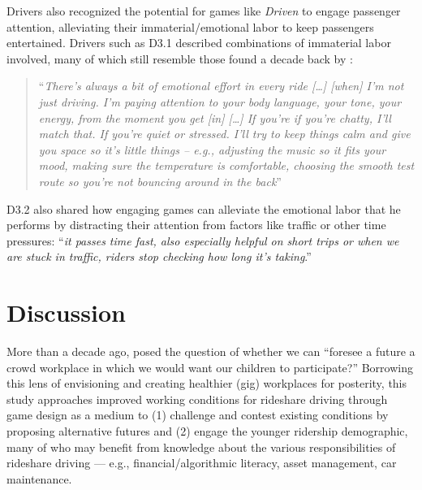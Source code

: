 Drivers also recognized the potential for games like \textit{Driven} to engage passenger attention, alleviating their immaterial/emotional labor to keep passengers entertained. Drivers such as D3.1 described combinations of immaterial labor involved, many of which still resemble those found a decade back by \citet{immaterial}: \
\begin{quote}
  ``\textit{There's always a bit of emotional effort in every ride [\dots] [when] I'm not just driving. I'm paying attention to your body language, your tone, your energy, from the moment you get [in] [\dots] If you're if you're chatty, I'll match that. If you're quiet or stressed. I'll try to keep things calm and give you space so it's little things -- e.g., adjusting the music so it fits your mood, making sure the temperature is comfortable, choosing the smooth test route so you're not bouncing around in the back}'' 
\end{quote}
D3.2 also shared how engaging games can alleviate the emotional labor that he performs by distracting their attention from factors like traffic or other time pressures:  ``\textit{it passes time fast, also especially helpful on short trips or when we are stuck in traffic, riders stop checking how long it's taking}.''

\section{Discussion}

More than a decade ago, \citet{kitturfuture} posed the question of whether we can ``foresee a future a crowd workplace in which we would want our children to participate?'' Borrowing this lens of envisioning and creating healthier (gig) workplaces for posterity, this study approaches improved working conditions for rideshare driving through game design as a medium to (1) challenge and contest existing conditions by proposing alternative futures and (2) engage the younger ridership demographic, many of who may benefit from knowledge about the various responsibilities of rideshare driving --- e.g., financial/algorithmic literacy, asset management, car maintenance.

